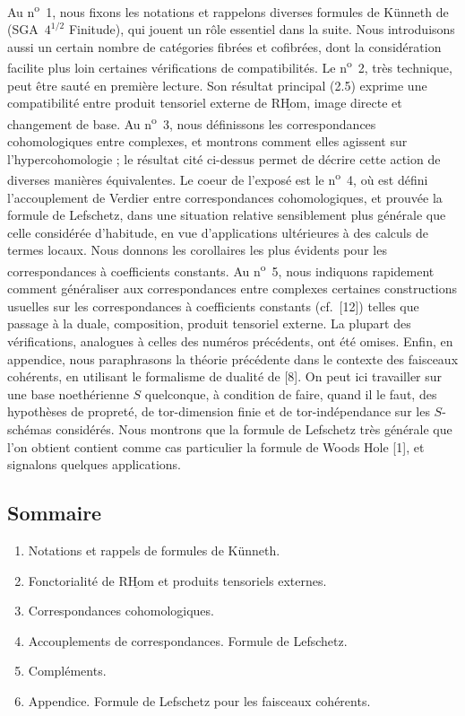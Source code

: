 \documentclass[11pt]{article}
\providecommand{\RHom}{\mathrm{RHom}}
\providecommand{\uRHom}{\underline{\RHom}}
\providecommand{\RHom}{\mathrm{RHom}}
\providecommand{\RHom}{\mathrm R\mathcal{H}om}
\providecommand{\RHom}{\mathrm{RHom}}
\begin{document}
Au n\textsuperscript{o}~1, nous fixons les notations et rappelons diverses formules de Künneth de (SGA~$4^{1/2}$ Finitude), qui jouent un rôle essentiel dans la suite. Nous introduisons aussi un certain nombre de catégories fibrées et cofibrées, dont la considération facilite plus loin certaines vérifications de compatibilités. Le n\textsuperscript{o}~2, très technique, peut être sauté en première lecture. Son résultat principal (2.5) exprime une compatibilité entre produit tensoriel externe de $\uRHom$, image directe et changement de base. Au n\textsuperscript{o}~3, nous définissons les correspondances cohomologiques entre complexes, et montrons comment elles agissent sur l'hypercohomologie ; le résultat cité ci-dessus permet de décrire cette action de diverses manières équivalentes. Le coeur de l'exposé est le n\textsuperscript{o}~4, où est défini l'accouplement de Verdier entre correspondances cohomologiques, et prouvée la formule de Lefschetz, dans une situation relative sensiblement plus générale que celle considérée d'habitude, en vue d'applications ultérieures à des calculs de termes locaux. Nous donnons les corollaires les plus évidents pour les correspondances à coefficients constants. Au n\textsuperscript{o}~5, nous indiquons rapidement comment généraliser aux correspondances entre complexes certaines constructions usuelles sur les correspondances à coefficients constants (cf.~[12]) telles que passage à la duale, composition, produit tensoriel externe. La plupart des vérifications, analogues à celles des numéros précédents, ont été omises. Enfin, en appendice, nous paraphrasons la théorie précédente dans le contexte des faisceaux cohérents, en utilisant le formalisme de dualité de [8]. On peut ici travailler sur une base noethérienne $S$ quelconque, à condition de faire, quand il le faut, des hypothèses de propreté, de tor-dimension finie et de tor-indépendance sur les $S$-schémas considérés. Nous montrons que la formule de Lefschetz très générale que l'on obtient contient comme cas particulier la formule de Woods Hole [1], et signalons quelques applications.

\subsection*{Sommaire}
\begin{enumerate}[label=\arabic*.]
\item Notations et rappels de formules de Künneth.
\item Fonctorialité de $\uRHom$ et produits tensoriels externes.
\item Correspondances cohomologiques.
\item Accouplements de correspondances. Formule de Lefschetz.
\item Compléments.
\item Appendice. Formule de Lefschetz pour les faisceaux cohérents.
\end{enumerate}
\end{document}
